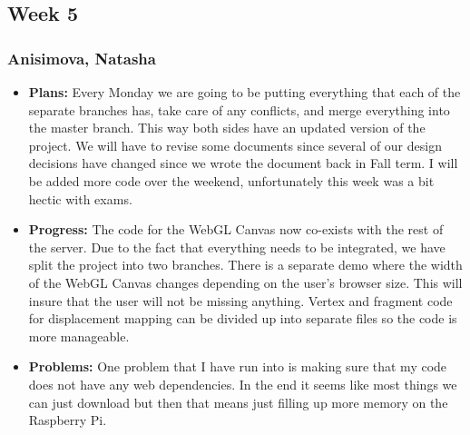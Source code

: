 \documentclass[10pt,draftclsnofoot,onecolumn]{IEEEtran}
\begin{document}
\subsection{Week 5}
\subsubsection{Anisimova, Natasha}
\begin{itemize}
	\item \textbf{Plans: }
	Every Monday we are going to be putting everything that each of the separate branches has, take care of any conflicts, and merge everything into the master branch. This way both sides have an updated version of the project. We will have to revise some documents since several of our design decisions have changed since we wrote the document back in Fall term. I will be added more code over the weekend, unfortunately this week was a bit hectic with exams.
	\item \textbf{Progress: }
	The code for the WebGL Canvas now co-exists with the rest of the server. Due to the fact that everything needs to be integrated, we have split the project into two branches. There is a separate demo where the width of the WebGL Canvas changes depending on the user's browser size. This will insure that the user will not be missing anything. Vertex and fragment code for displacement mapping can be divided up into separate files so the code is more manageable.
	\item \textbf{Problems: }
	One problem that I have run into is making sure that my code does not have any web dependencies. In the end it seems like most things we can just download but then that means just filling up more memory on the Raspberry Pi.
\end{itemize}
\end{document}

